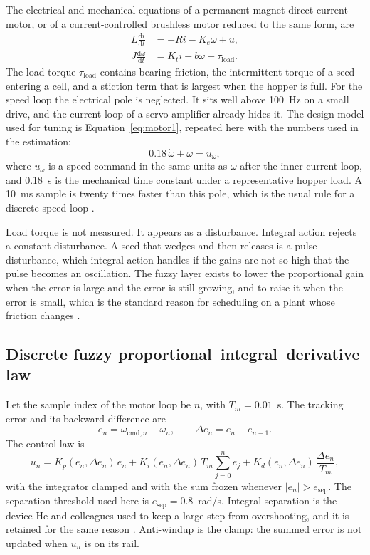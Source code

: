 The electrical and mechanical equations of a permanent-magnet direct-current motor, or of a current-controlled brushless motor reduced to the same form, are
\begin{align}
L\frac{\mathrm{d}i}{\mathrm{d}t} &= -Ri - K_e\omega + u, \label{eq:elec}\\
J\frac{\mathrm{d}\omega}{\mathrm{d}t} &= K_t i - b\omega - \tau_{\mathrm{load}}. \label{eq:mech}
\end{align}
The load torque $\tau_{\mathrm{load}}$ contains bearing friction, the intermittent torque of a seed entering a cell, and a stiction term that is largest when the hopper is full. For the speed loop the electrical pole is neglected. It sits well above 100~Hz on a small drive, and the current loop of a servo amplifier already hides it. The design model used for tuning is Equation~\eqref{eq:motor1}, repeated here with the numbers used in the estimation:
\begin{equation}
0.18\,\dot\omega + \omega = u_{\omega},
\label{eq:motornum}
\end{equation}
where $u_{\omega}$ is a speed command in the same units as $\omega$ after the inner current loop, and 0.18~s is the mechanical time constant under a representative hopper load. A 10~ms sample is twenty times faster than this pole, which is the usual rule for a discrete speed loop \cite{franklin2019,ogata2010}.

Load torque is not measured. It appears as a disturbance. Integral action rejects a constant disturbance. A seed that wedges and then releases is a pulse disturbance, which integral action handles if the gains are not so high that the pulse becomes an oscillation. The fuzzy layer exists to lower the proportional gain when the error is large and the error is still growing, and to raise it when the error is small, which is the standard reason for scheduling on a plant whose friction changes \cite{zhao2024,astrom2006}.

\subsection{Discrete fuzzy proportional--integral--derivative law}

Let the sample index of the motor loop be $n$, with $T_m=0.01$~s. The tracking error and its backward difference are
\begin{equation}
e_n = \omega_{\mathrm{cmd},n} - \omega_n, \qquad \Delta e_n = e_n - e_{n-1}.
\label{eq:err}
\end{equation}
The control law is
\begin{equation}
u_n = K_p(e_n,\Delta e_n)\, e_n + K_i(e_n,\Delta e_n)\, T_m\sum_{j=0}^{n} e_j + K_d(e_n,\Delta e_n)\,\frac{\Delta e_n}{T_m},
\label{eq:pid}
\end{equation}
with the integrator clamped and with the sum frozen whenever $|e_n|>e_{\mathrm{sep}}$. The separation threshold used here is $e_{\mathrm{sep}}=0.8$~rad/s. Integral separation is the device He and colleagues used to keep a large step from overshooting, and it is retained for the same reason \cite{he2017}. Anti-windup is the clamp: the summed error is not updated when $u_n$ is on its rail.

